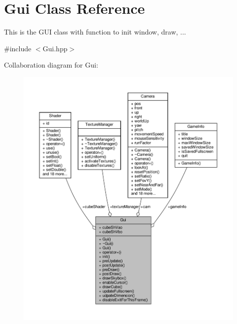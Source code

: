 \hypertarget{class_gui}{}\section{Gui Class Reference}
\label{class_gui}


This is the G\+UI class with function to init window, draw, ...  




{\ttfamily \#include $<$Gui.\+hpp$>$}



Collaboration diagram for Gui\+:
\nopagebreak
\begin{figure}[H]
\begin{center}
\leavevmode
\includegraphics[width=350pt]{class_gui__coll__graph}
\end{center}
\end{figure}
